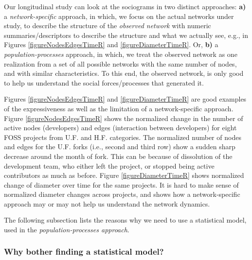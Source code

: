 \documentclass{acm_proc_article-sp}
\begin{document}
Our longitudinal study can look at the sociograms in two distinct approaches: \textbf{a)} a \textit{network-specific} approach, in which, we focus on the actual networks under study, to describe the structure of the \textit{observed network} with numeric summaries/descriptors to describe the structure and what we actually see, e.g., in Figures \ref{figureNodesEdgesTimeR} and \ref{figureDiameterTimeR}. Or, \textbf{b)} a \textit{population-processes} approach, in which, we treat the observed network as one realization from a set of all possible networks with the same number of nodes, and with similar characteristics. To this end, the observed network, is only good to help us understand the social forces/processes that generated it. 

Figures \ref{figureNodesEdgesTimeR} and \ref{figureDiameterTimeR} are good examples of the expressiveness as well as the limitation of a network-specific approach. Figure \ref{figureNodesEdgesTimeR} shows the normalized change in the number of active nodes (developers) and edges (interaction between developers) for eight FOSS projects from U.F. and H.F. categories. The normalized number of nodes and edges for the U.F. forks (i.e., second and third row) show a sudden sharp decrease around the month of fork. This can be because of dissolution of the development team, who either left the project, or stopped being active contributors as much as before. Figure  \ref{figureDiameterTimeR} shows normalized change of diameter over time for the same projects. It is hard to make sense of normalized diameter changes across projects, and shows how a network-specific approach may or may not help us understand the network dynamics.  

The following subsection lists the reasons why we need to use a statistical model, used in the \textit{population-processes approach}.

\subsubsection{Why bother finding a statistical model?}
\end{document}
